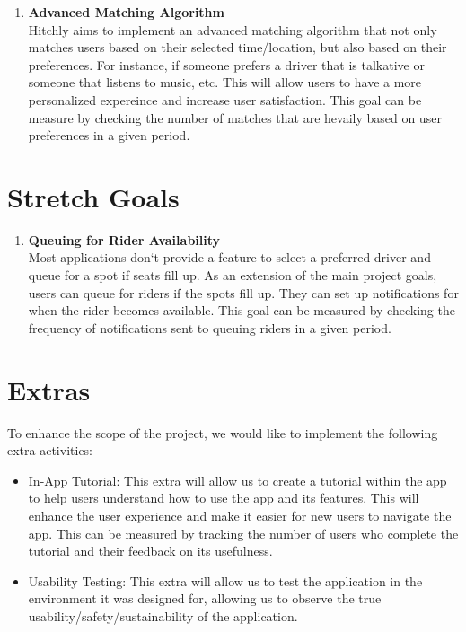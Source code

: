 \documentclass{article}
\begin{document}
\begin{enumerate}
\item \textbf{Advanced Matching Algorithm} \\
Hitchly aims to implement an advanced matching algorithm that not only matches users based on their selected time/location, but also based on their preferences. For instance, if someone prefers a driver that is talkative or someone that listens to music, etc. This will allow users to have a more personalized expereince and increase user satisfaction. This goal can be measure by checking the number of matches that are hevaily based on user preferences in a given period.
\end{enumerate}

\section{Stretch Goals}
\begin{enumerate}
\item \textbf{Queuing for Rider Availability}\\
Most applications don`t provide a feature to select a preferred driver and queue for a spot if seats fill up. As an extension of the main project goals, users can queue for riders if the spots fill up. They can set up notifications for when the rider becomes available. This goal can be measured by checking the frequency of notifications sent to queuing riders in a given period. 
\end{enumerate}

\section{Extras} 

To enhance the scope of the project, we would like to implement the following extra
activities:
\begin{itemize}
\item In-App Tutorial: This extra will allow us to create a tutorial within the app to help users understand how to use the app and its features. This will enhance the user experience and make it easier for new users to navigate the app. This can be measured by tracking the number of users who complete the tutorial and their feedback on its usefulness.
\item Usability Testing: This extra will allow us to test the application in the environment
it was designed for, allowing us to observe the true usability/safety/sustainability of the application.
\end{itemize}
\end{document}
